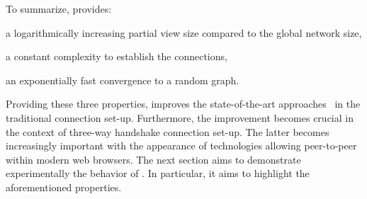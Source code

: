 To summarize, \SCAMPLON{} provides:
\begin{inparaenum}[(i)]
\item a logarithmically increasing partial view size compared to the global
  network size,
\item a constant complexity to establish the connections,
\item an exponentially fast convergence to a random graph.
\end{inparaenum}
Providing these three properties, \SCAMPLON{} improves the state-of-the-art
approaches~\cite{ganesh2001scamp,voulgaris2005cyclon} in the traditional
connection set-up. Furthermore, the improvement becomes crucial in the context
of three-way handshake connection set-up.  The latter becomes increasingly
important with the appearance of technologies allowing peer-to-peer within
modern web browsers.  The next section aims to demonstrate experimentally the
behavior of \SCAMPLON{}. In particular, it aims to highlight the aforementioned
properties.


